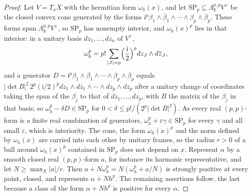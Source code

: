 \documentclass[11pt,reqno]{amsart}
\theoremstyle{plain}
\theoremstyle{definition}
\theoremstyle{remark}
\newcommand{\RR}{\mathbb{R}}
\newcommand{\bbar}[1]{\overline{#1}}
\begin{document}
\begin{proof}
Let $V=T_{x}X$ with the hermitian form $\omega_{h}(x)$, and let
$\mathrm{SP}_{p}\subseteq\Lambda^{p,p}_{\RR}V^{\vee}$ be the closed convex cone
generated by the forms $\mathrm{i}^{p}\beta_{1}\wedge\bbar{\beta}_{1}\wedge\cdots
\wedge\beta_{p}\wedge\bbar{\beta}_{p}$. These forms span
$\Lambda^{p,p}_{\RR}V^{\vee}$, so $\mathrm{SP}_{p}$ has nonempty interior, and
$\omega_{h}(x)^{p}$ lies in that interior: in a unitary basis $dz_{1},\dots,
dz_{n}$ of $V^{\vee}$,
\[
  \omega_{h}^{p}=p!\sum_{|J|=p}\Bigl(\frac{\mathrm{i}}{2}\Bigr)^{p}
  dz_{J}\wedge d\bbar{z}_{J},
\]
and a generator $D=\mathrm{i}^{p}\beta_{1}\wedge\bbar{\beta}_{1}\wedge\cdots\wedge
\beta_{p}\wedge\bbar{\beta}_{p}$ equals $|\det B|^{2}\,2^{p}(\mathrm{i}/2)^{p}
dz_{1}\wedge d\bbar{z}_{1}\wedge\cdots\wedge dz_{p}\wedge d\bbar{z}_{p}$ after a
unitary change of coordinates taking the span of the $\beta_{j}$ to that of
$dz_{1},\dots,dz_{p}$, with $B$ the matrix of the $\beta_{j}$ in that basis;
so $\omega_{h}^{p}-\delta D\in\mathrm{SP}_{p}$ for $0<\delta\le p!/(2^{p}
|\det B|^{2})$. As every real $(p,p)$-form is a finite real combination of
generators, $\omega_{h}^{p}+\varepsilon\gamma\in\mathrm{SP}_{p}$ for every
$\gamma$ and all small $\varepsilon$, which is interiority. The cone, the form
$\omega_{h}(x)^{p}$ and the norm defined by $\omega_{h}(x)$ are carried into
each other by unitary frames, so the radius $r>0$ of a ball around
$\omega_{h}(x)^{p}$ contained in $\mathrm{SP}_{p}$ does not depend on $x$.
Represent $\alpha$ by a smooth closed real $(p,p)$-form $a$, for instance its
harmonic representative, and let $N\ge\max_{X}|a|/r$. Then
$a+N\omega_{h}^{p}=N(\omega_{h}^{p}+a/N)$ is strongly positive at every point,
closed, and represents $\alpha+Nh^{p}$. The remaining assertions follow, the
last because a class of the form $\alpha+Nh^{p}$ is positive for every $\alpha$.
\end{proof}
\end{document}
